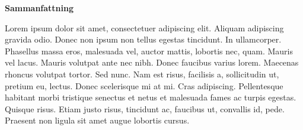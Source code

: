 \documentclass{tex/martin}
\begin{document}


\cleardoublepage
\begin{center}
\sffamily\textbf{Sammanfattning} 
\end{center}
Lorem ipsum dolor sit amet, consectetuer adipiscing elit. Aliquam adipiscing gravida odio. Donec non ipsum non tellus egestas tincidunt. In ullamcorper. Phasellus massa eros, malesuada vel, auctor mattis, lobortis nec, quam. Mauris vel lacus. Mauris volutpat ante nec nibh. Donec faucibus varius lorem. Maecenas rhoncus volutpat tortor. Sed nunc. Nam est risus, facilisis a, sollicitudin ut, pretium eu, lectus. Donec scelerisque mi at mi. Cras adipiscing. Pellentesque habitant morbi tristique senectus et netus et malesuada fames ac turpis egestas. Quisque risus. Etiam justo risus, tincidunt ac, faucibus ut, convallis id, pede. Praesent non ligula sit amet augue lobortis cursus.
\end{document}
